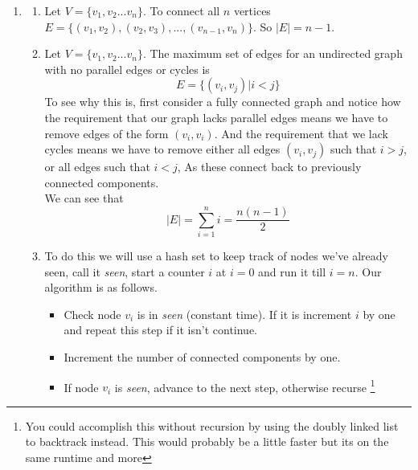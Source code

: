 \documentclass[11pt]{article}
\begin{document}
\begin{enumerate}
		\item
			\begin{enumerate}
			\item Let $V = \{v_1, v_2 ... v_n \}$.
			To connect all $n$
				vertices $E = \{(v_1,v_2),(v_2,v_3), ... ,
				(v_{n-1},v_n) \}$. So $|E| = n - 1$.
			\item Let $V = \{v_1, v_2 ... v_n \}$.
			 The maximum set of edges for an undirected graph with
					no parallel edges or cycles is 
					$$ E = \{ (v_i,v_j) | i < j \}  $$
					To see why this is,
				first consider a fully connected graph and
				notice how the requirement that our graph lacks
					parallel edges means we have to remove 
					edges of the form $(v_i,v_i)$. And the
					requirement that we lack 
				cycles means we have to remove either
					all edges $(v_i,v_j)$ such that
					$i > j$,
					or all edges such that $i < j$,
					As these connect back to previously
					connected components.\\
					We can see that
				           $$ |E| = \sum_{i=1}^ni = \frac{n(n-1)}{2} $$
                        \item
				To do this we will use a hash set to keep track of
                                        nodes we've already seen, call
                                        it \textit{seen}, start a counter $i$ at
                                        $i = 0$ and run it till $i = n$.
                                        Our algorithm is as follows.
                        \begin{itemize}
                                \item Check node $v_i$ is in
                                        \textit{seen} (constant time). If it is
                                        increment $i$ by one and repeat this
                                        step if it isn't continue.
                                \item Increment the number of connected
                                        components by one.
                                \item If node $v_i$ is \textit{seen}, advance to
                                        the next step, otherwise
                                        recurse \footnote{You could accomplish
                                        this without recursion by using the
                                        doubly linked list to backtrack instead.
                                        This would probably be a little faster
                                        but its on the same runtime and more
}
\end{itemize}
\end{enumerate}
\end{enumerate}
\end{document}
